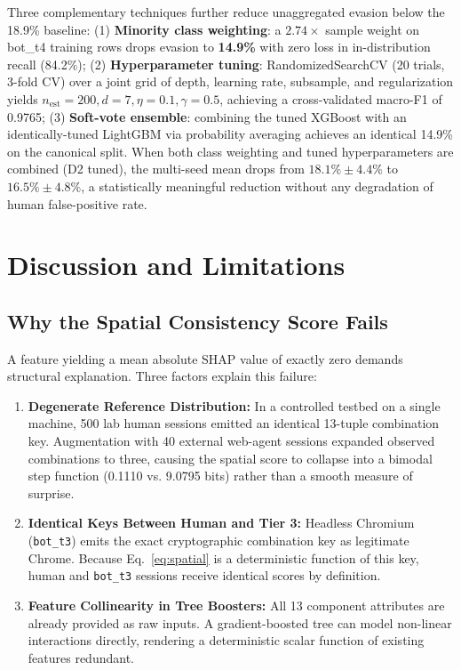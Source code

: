 \documentclass[conference]{IEEEtran}
\begin{document}
Three complementary techniques further reduce unaggregated evasion below the 18.9\% baseline: (1) \textbf{Minority class weighting}: a $2.74\times$ sample weight on bot\_t4 training rows drops evasion to \textbf{14.9\%} with zero loss in in-distribution recall (84.2\%); (2) \textbf{Hyperparameter tuning}: RandomizedSearchCV (20 trials, 3-fold CV) over a joint grid of depth, learning rate, subsample, and regularization yields $n_\text{est}=200, d=7, \eta=0.1, \gamma=0.5$, achieving a cross-validated macro-F1 of 0.9765; (3) \textbf{Soft-vote ensemble}: combining the tuned XGBoost with an identically-tuned LightGBM via probability averaging achieves an identical 14.9\% on the canonical split. When both class weighting and tuned hyperparameters are combined (D2 tuned), the multi-seed mean drops from $18.1\% \pm 4.4\%$ to $\mathbf{16.5\% \pm 4.8\%}$, a statistically meaningful reduction without any degradation of human false-positive rate.

\section{Discussion and Limitations}

\subsection{Why the Spatial Consistency Score Fails}
A feature yielding a mean absolute SHAP value of exactly zero demands structural explanation. Three factors explain this failure:
\begin{enumerate}
    \item \textbf{Degenerate Reference Distribution:} In a controlled testbed on a single machine, 500 lab human sessions emitted an identical 13-tuple combination key. Augmentation with 40 external web-agent sessions expanded observed combinations to three, causing the spatial score to collapse into a bimodal step function (0.1110 vs. 9.0795 bits) rather than a smooth measure of surprise.
    \item \textbf{Identical Keys Between Human and Tier 3:} Headless Chromium (\texttt{bot\_t3}) emits the exact cryptographic combination key as legitimate Chrome. Because Eq.~\ref{eq:spatial} is a deterministic function of this key, human and \texttt{bot\_t3} sessions receive identical scores by definition.
    \item \textbf{Feature Collinearity in Tree Boosters:} All 13 component attributes are already provided as raw inputs. A gradient-boosted tree can model non-linear interactions directly, rendering a deterministic scalar function of existing features redundant.
\end{enumerate}
\end{document}
